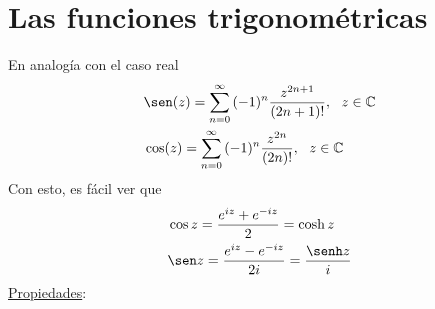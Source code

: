 \section{Las funciones trigonométricas}
En analogía con el caso real
\begin{align*}
     & \sen(z) = \sum_{n=0}^{\infty}{(-1)^n\frac{z^{2n+1}}{(2n+1)!}}, \ \ z \in \com \\
     & \cos(z) = \sum_{n=0}^{\infty}{(-1)^n\frac{z^{2n}}{(2n)!}}, \ \ z \in \com
\end{align*}
Con esto, es fácil ver que
\begin{align*}
     & \cos z = \frac{e^{iz}+e^{-iz}}{2} = \cosh z            \\
     & \sen z = \frac{e^{iz}-e^{-iz}}{2i} = \frac{\senh z}{i}
\end{align*}
\underline{Propiedades}:
